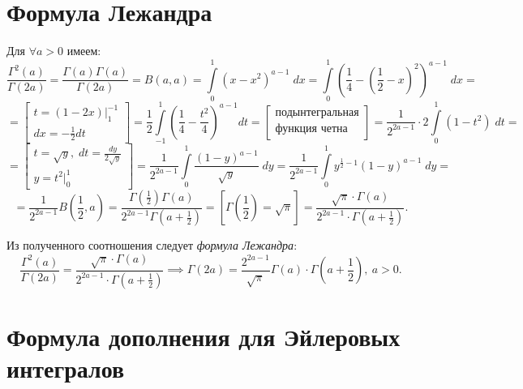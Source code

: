 \documentclass[../../main.tex]{subfiles}
\begin{document}
\section{Формула Лежандра}
	
	Для $\forall a > 0$ имеем:
	\[ \frac{\Gamma^2(a)}{\Gamma(2a)} = \frac{\Gamma(a) \Gamma(a)}{\Gamma(2a)} = 
	B(a,a) = \int\limits_{0}^{1} \left(x-x^2 \right) ^{a-1} \; dx = 
	\int\limits_{0}^{1} \left(\frac{1}{4} - \left( \frac{1}{2} - x\right)^2  
	\right) ^{a-1} \; dx =  \]
	\[  =  \left[  \begin{gathered}
	t = (1-2x) \big|_{1}^{-1} \\
	dx = -\frac{1}{2} dt 
	\end{gathered}   \right] = \frac{1}{2}  \int\limits_{-1}^{1} \left( 
	\frac{1}{4} - \frac{t^2}{4}  \right)^{a-1} dt =\left[ 
	\begin{gathered}
	\text{подынтегральная} \\
	\text{функция четна}
	\end{gathered}	\right] = \frac{1}{2^{2a-1}} \cdot 2 \int\limits_{0}^{1} 
	\left( 
	1-t^2  \right)  \; dt =     \] 
	\[  =  \left[  \begin{gathered}
	t = \sqrt{y}, \; dt = \frac{dy}{2\sqrt{y}} \\
	y = t^2  \big|_{0}^{1}
	\end{gathered}   \right] =  \frac{1}{2^{2a-1}} \int\limits_{0}^{1} 
	\frac{(1-y)^{a-1}}{\sqrt{y}} \; dy  = \frac{1}{2^{2a-1}} \int\limits_{0}^{1} 
	y^{\frac{1}{2} - 1}(1-y)^{a-1} \; dy  =     \]
	\[  = \frac{1}{2^{2a-1}} B\left( \frac{1}{2},a \right) = \frac{\Gamma\left( 
	\frac{1}{2} \right) \Gamma(a) }{2^{2a-1} \Gamma\left( a + \frac{1}{2} 
	\right)} = \left[ \Gamma\left( \frac{1}{2} \right) = \sqrt{\pi}  \right] = 
	\frac{\sqrt{\pi} \cdot \Gamma(a) }{2^{2a-1} \cdot \Gamma\left( a + 
	\frac{1}{2} \right)}. 
	 \]
	
	Из полученного соотношения следует \emph{формула Лежандра}:
	\begin{equation}
	\label{14:13}
	\frac{\Gamma^2(a)}{\Gamma(2a)} = \frac{\sqrt{\pi} \cdot \Gamma(a) }{2^{2a-1} 
	\cdot \Gamma\left( a + \frac{1}{2} \right)} \implies
	\Gamma(2a) = \frac{2^{2a-1}}{\sqrt{\pi}} \Gamma(a) \cdot \Gamma\left(a + 
	\frac{1}{2} 
	\right),\ 
	a > 0.
	\end{equation}
	
	\section{Формула дополнения для Эйлеровых интегралов}
	
\end{document}
